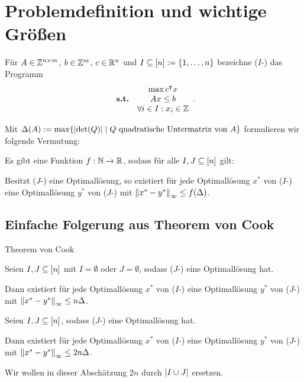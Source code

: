 \section{Problemdefinition und wichtige Größen}

\begin{frame}
	\renewcommand{\thisthmnumber}{}
	\begin{definition}
		Für $A\in\mathbb{Z}^{n\times m}$, $b\in\mathbb{Z}^m$, $c\in\mathbb{R}^n$ und $I\subseteq[n]:=\{1,\dots,n\}$ bezeichne ($I$-\MIPI) das Programm
		$$\begin{array}{lc}
		&\max c^\intercal x \\
		\textbf{s.t.} &Ax\leq b\\
		&\forall i\in I: x_i\in\mathbb{Z}
		\end{array}.$$
	\end{definition}

	\pause
	Mit $\Delta(A):=\max\{\lvert  \det(Q) \rvert \mid Q \text{ quadratische Untermatrix von } A \}$ formulieren wir folgende Vermutung:
	
	\pause
	\renewcommand{\thisthmnumber}{1.1}
	\begin{conjecture}
		Es gibt eine Funktion $f: \mathbb{N}\rightarrow\mathbb{R}$, sodass für alle $I,J\subseteq[n]$ gilt:
		
		Besitzt ($J$-\MIPI) eine Optimallösung, so existiert für jede Optimallösung $x^*$ von ($I$-\MIPI) eine Optimallösung $y^*$ von ($J$-\MIPI) mit $\left\lVert x^* - y^*\right\rVert_\infty\leq f(\Delta)$.
	\end{conjecture}
\end{frame}

\subsection{Einfache Folgerung aus Theorem von Cook}
\begin{frame}{Theorem von Cook}
\renewcommand{\thisthmnumber}{2.1}
\begin{thm}[Cook u. a., 1986]\label{thm:cook}
	Seien $I, J\subseteq[n]$ mit $I=\emptyset$ oder $J=\emptyset$, sodass ($J$-\MIPI) eine Optimallösung hat.
	
	Dann existiert für jede Optimallösung $x^*$ von ($I$-\MIPI) eine Optimallösung $y^*$ von ($J$-\MIPI) mit $\left\lVert x^*-y^*\right\rVert_\infty\leq n\Delta$.
\end{thm}
\pause
\renewcommand{\thisthmnumber}{2.2}
\begin{korollar}
	Seien $I,J\subseteq[n]$, sodass ($J$-\MIPI) eine Optimallösung hat.
	
	Dann existiert für jede Optimallösung $x^*$ von ($I$-\MIPI) eine Optimallösung $y^*$ von ($J$-\MIPI) mit $\left\lVert x^*-y^*\right\rVert_\infty\leq2 n\Delta$.
\end{korollar}
\pause
Wir wollen in dieser Abschätzung $2n$ durch $\lvert I\cup J \rvert$ ersetzen.
\end{frame}

